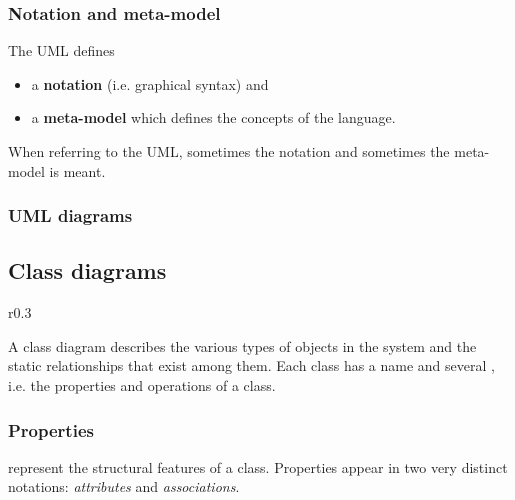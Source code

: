 \subsubsection{Notation and meta-model}
The UML defines
\begin{itemize}
\item a \textbf{notation} (i.e. graphical syntax) and
\item a \textbf{meta-model} which defines the concepts of the language.
\end{itemize}
When referring to the UML, sometimes the notation and sometimes the meta-model is meant.

\subsubsection{UML diagrams}

\subsection{Class diagrams}
\begin{wrapfigure}{r}{0.3\textwidth}
\vspace{-10pt}
\vspace{-20pt}
\end{wrapfigure}

A class diagram describes the various types of objects in the system and the static relationships that exist among them. Each class has a name and several , i.e. the properties and operations of a class. 

\subsubsection{Properties}
 represent the structural features of a class. Properties appear in two very distinct notations: \textit{attributes} and \textit{associations}.

